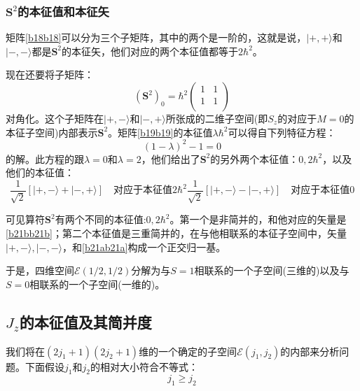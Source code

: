 \documentclass[]{article}
\begin{document}
\subsubsection{$\boldsymbol{S}^2$的本征值和本征矢}
矩阵\eqref{b18b18}可以分为三个子矩阵，其中的两个是一阶的，这就是说，$|+,+\rangle$和$|-,-\rangle$都是$\boldsymbol{S}^2$的本征矢，他们对应的两个本征值都等于$2\hbar^2$。\par 
现在还要将子矩阵：
\begin{equation}
	(\boldsymbol{S}^2)_0=\hbar^2\begin{pmatrix}
		1&1\\
		1&1\\
	\end{pmatrix}
	\label{b19b19}
\end{equation}
对角化。这个子矩阵在$|+,-\rangle$和$|-,+\rangle$所张成的二维子空间(即$S_z$的对应于$M=0$的本征子空间)内部表示$\boldsymbol{S}^2$。矩阵\eqref{b19b19}的本征值$\lambda\hbar^2$可以得自下列特征方程：
\begin{equation}
	(1-\lambda)^2-1=0
\end{equation}
的解。此方程的跟$\lambda=0$和$\lambda=2$，他们给出了$\boldsymbol{S}^2$的另外两个本征值：$0,2\hbar^2$，以及他们的本征值：
\begin{subequations}
	\begin{equation}
		\dfrac{1}{\sqrt{2}}[|+,-\rangle+|-,+\rangle]\quad\text{对应于本征值$2\hbar^2$}
		\label{b21ab21a}
	\end{equation}
	\begin{equation}
		\dfrac{1}{\sqrt{2}}[|+,-\rangle-|-,+\rangle]\quad\text{对应于本征值$0$}
		\label{b21bb21b}
	\end{equation}
\end{subequations}

可见算符$\boldsymbol{S}^2$有两个不同的本征值:$0,2\hbar^2$。第一个是非简并的，和他对应的矢量是\eqref{b21bb21b}；第二个本征值是三重简并的，在与他相联系的本征子空间中，矢量$|+,-\rangle,|-,-\rangle$，和\eqref{b21ab21a}构成一个正交归一基。\par 
于是，四维空间$\mathscr{E}(1/2,1/2)$分解为与$S=1$相联系的一个子空间(三维的)以及与$S=0$相联系的一个子空间(一维的)。
\subsection{$J_z$的本征值及其简并度}
我们将在$(2j_1+1)(2j_2+1)$维的一个确定的子空间$\mathscr{E}(j_1,j_2)$的内部来分析问题。下面假设$j_1$和$j_2$的相对大小符合不等式：
\begin{equation}
	j_1\geqslant j_2
\end{equation}
\end{document}
